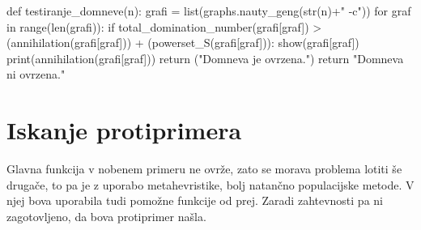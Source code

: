 \documentclass[11pt, a4paper]{article}
\begin{document}
\begin{spverbatim}
def testiranje_domneve(n):
    grafi = list(graphs.nauty_geng(str(n)+" -c"))
    for graf in range(len(grafi)):
        if total_domination_number(grafi[graf]) > (annihilation(grafi[graf])) + (powerset_S(grafi[graf])):
            show(grafi[graf])
            print(annihilation(grafi[graf]))
            return ("Domneva je ovrzena.")
    return "Domneva ni ovrzena."
\end{spverbatim}

\section{\textbf{Iskanje protiprimera}}
Glavna funkcija v nobenem primeru ne ovrže, zato se morava problema lotiti še drugače, to pa je z uporabo metahevristike, bolj natančno populacijske metode. V njej bova uporabila tudi pomožne funkcije od prej. Zaradi zahtevnosti pa ni zagotovljeno, da bova protiprimer našla.
\end{document}
